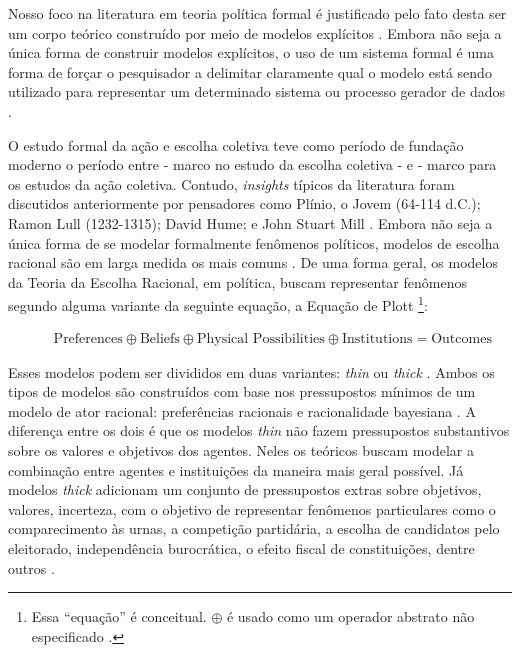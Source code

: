 Nosso foco na literatura em teoria política formal é justificado pelo fato desta
ser um corpo teórico construído por meio de modelos
explícitos \cite{epstein2008model}. Embora não seja a única forma de
construir modelos explícitos, o uso de um sistema formal é uma forma de forçar o
pesquisador a delimitar claramente qual o modelo está sendo utilizado para
representar um determinado sistema ou processo gerador de dados
\cite{morton1999methods, smaldino2017models}.

O estudo formal da ação e escolha coletiva teve como período de fundação moderno
o período entre  - marco no estudo da escolha
coletiva - e  - marco para os estudos da ação
coletiva. Contudo, \textit{insights} típicos da literatura foram discutidos
anteriormente por pensadores como Plínio, o Jovem (64-114 d.C.); Ramon Lull
(1232-1315); David Hume; e John Stuart Mill \cite{mclean2015strange,
  sep-free-rider, ordeshook1990emerging}. Embora não seja a única forma de se
modelar formalmente fenômenos políticos, modelos de escolha racional são em
larga medida os mais comuns \cite{austen1998social}. De uma forma geral, os
modelos da Teoria da Escolha Racional, em política, buscam representar fenômenos
segundo alguma variante da seguinte equação, a Equação de Plott
\cite{munger2015choosing, ostrom1986agenda}\footnote{Essa ``equação'' é
  conceitual. \(\oplus\) é usado como um operador abstrato não especificado
  \cite{ostrom1986agenda}. }:
\begin{figure}[H]
\begin{align*}
  \text{Preferences} \oplus \text{Beliefs}  \oplus  \text{Physical Possibilities} \oplus \text{Institutions} = \text{Outcomes}
\end{align*}
\end{figure}
Esses modelos podem ser divididos em duas variantes: \textit{thin} ou
\textit{thick} \cite{hechter1997sociological, green1996pathologies}. Ambos os
tipos de modelos são construídos com base nos pressupostos mínimos de um modelo
de ator racional: preferências racionais e racionalidade bayesiana
\cite{gintis2016individuality}. A diferença entre os dois é que os modelos
\textit{thin} não fazem pressupostos substantivos sobre os valores e objetivos
dos agentes. Neles os teóricos buscam modelar a combinação entre agentes e
instituições da maneira mais geral possível. Já modelos \textit{thick} adicionam
um conjunto de pressupostos extras sobre objetivos, valores, incerteza, com o
objetivo de representar fenômenos particulares como o comparecimento às urnas, a
competição partidária, a escolha de candidatos pelo eleitorado, independência
burocrática, o efeito fiscal de constituições, dentre outros
\cite{bendor2011behavioral}.

